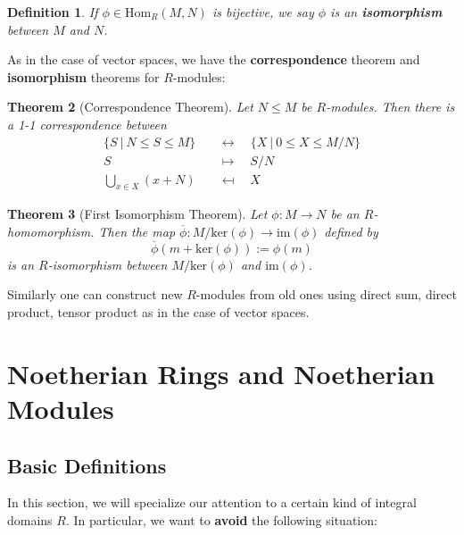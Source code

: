 \documentclass[12pt]{amsbook}
\newtheorem{theorem}{Theorem}[section]
\newtheorem{definition}[theorem]{Definition}
\begin{document}
\begin{definition}
    If $\phi\in\mathrm{Hom}_{R}(M,N)$ is bijective, we say $\phi$ is an {\bf isomorphism} between $M$ and $N$.
\end{definition}

As in the case of vector spaces, we have the {\bf correspondence} theorem and {\bf isomorphism} theorems for $R$-modules:

\begin{theorem} [Correspondence Theorem]
    Let $N\leq M$ be $R$-modules. Then there is a 1-1 correspondence between
    \begin{align*}
        \{S\ |\ N\leq S\leq M\}\quad&\leftrightarrow\quad\{X\ |\ 0\leq X\leq M/N\}\\
        S\quad&\mapsto\quad S/N\\
        \bigcup_{x\in X}(x+N)\quad&\mapsfrom\quad X
    \end{align*}
\end{theorem}

\begin{theorem} [First Isomorphism Theorem]
    Let $\phi:M\to N$ be an $R$-homomorphism. Then the map $\overline{\phi}:M/\mathrm{ker}(\phi)\to \mathrm{im}(\phi)$ defined by
    $$\overline{\phi}(m+\mathrm{ker}(\phi)):=\phi(m)$$
    is an $R$-isomorphism between $M/\mathrm{ker}(\phi)$ and $\mathrm{im}(\phi)$.
\end{theorem}

Similarly one can construct new $R$-modules from old ones using direct sum, direct product, tensor product as in the case of vector spaces.



\chapter{Noetherian Rings and Noetherian Modules}
\section{Basic Definitions}
In this section, we will specialize our attention to a certain kind of integral domains $R$. In particular, we want to {\bf avoid} the following situation:
\end{document}
